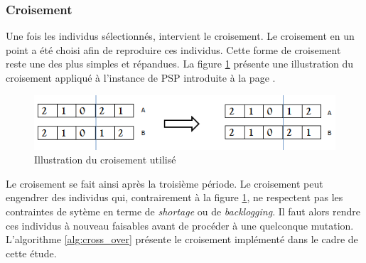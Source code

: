 \documentclass[12pt,a4paper]{article}
\begin{document}
		\subsubsection{Croisement}
		
		Une fois les individus sélectionnés, intervient le croisement. Le croisement en un point a été choisi afin de reproduire ces individus. Cette forme de croisement reste une des plus simples et répandues. La figure \ref{fig:used_cross_over} présente une illustration du croisement appliqué à l'instance de PSP introduite à la page \pageref{ex:psp}. \\
		\begin{figure}[!h]
			\begin{center}
				\includegraphics[scale=.5]{img/cross_over_fig.png}
				\caption{Illustration du croisement utilisé}
				\label{fig:used_cross_over}
			\end{center}
		\end{figure}
		
		\hspace*{.5cm} Le croisement se fait ainsi après la troisième période. Le croisement peut engendrer des individus qui, contrairement à la figure \ref{fig:used_cross_over}, ne respectent pas les contraintes de sytème en terme de \emph{shortage} ou de \emph{backlogging}. Il faut alors rendre ces individus à nouveau faisables avant de procéder à une quelconque mutation. L'algorithme \ref{alg:cross_over} présente le croisement implémenté dans le cadre de cette étude.\\
		
\end{document}
